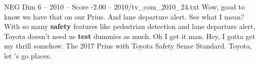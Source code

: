 \begin{textsample}{NEG Dim 6 – 2010 – Score -2.00 – 2010/tv\_com\_2010\_24.txt}  \label{ex:f6_neg_043}
Wow, good to know we have that on our Prius.
And lane departure alert.
See what I mean?
With so many \textbf{safety} features like pedestrian detection and lane departure alert, Toyota doesn't need us \textbf{test} dummies as much.
Oh I get it man.
Hey, I gotta get my thrill somehow.
The 2017 Prius with Toyota Safety Sense Standard.
Toyota, let 's go places.

\end{textsample}
